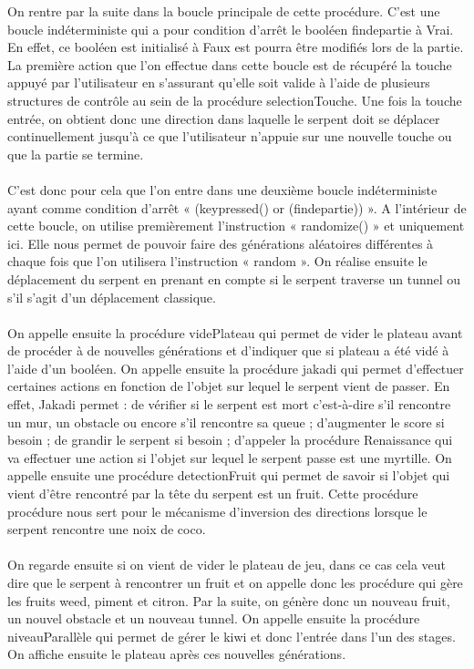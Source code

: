 \documentclass[11pt,a4paper]{article}
\begin{document}
        On rentre par la suite dans la boucle principale de cette procédure. C’est une boucle indéterministe qui a pour condition d’arrêt le booléen findepartie à Vrai. En effet, ce booléen est initialisé à Faux est pourra être modifiés lors de la partie. La première action que l’on effectue dans cette boucle est de récupéré la touche appuyé par l’utilisateur en s’assurant qu’elle soit valide à l’aide de plusieurs structures de contrôle au sein de la procédure selectionTouche. Une fois la touche entrée, on obtient donc une direction dans laquelle le serpent doit se déplacer continuellement jusqu’à ce que l’utilisateur n’appuie sur une nouvelle touche ou que la partie se termine.\\\\
        C’est donc pour cela que l’on entre dans une deuxième boucle indéterministe ayant comme condition d’arrêt « (keypressed() or (findepartie)) ». A l’intérieur de cette boucle, on utilise premièrement l’instruction « randomize() » et uniquement ici. Elle nous permet de pouvoir faire des générations aléatoires différentes à chaque fois que l’on utilisera l’instruction « random ». On réalise ensuite le déplacement du serpent en prenant en compte si le serpent traverse un tunnel ou s’il s’agit d’un déplacement classique. \\\\
        On appelle ensuite la procédure videPlateau qui permet de vider le plateau avant de procéder à de nouvelles générations et d’indiquer que si plateau a été vidé à l’aide d’un booléen. On appelle ensuite la procédure jakadi qui permet d’effectuer certaines actions en fonction de l’objet sur lequel le serpent vient de passer. En effet, Jakadi permet : de vérifier si le serpent est mort c’est-à-dire s'il rencontre un mur, un obstacle ou encore s’il rencontre sa queue ; d’augmenter le score si besoin ; de grandir le serpent si besoin ; d’appeler la procédure Renaissance qui va effectuer une action si l’objet sur lequel le serpent passe est une myrtille. On appelle ensuite une procédure detectionFruit qui permet de savoir si l’objet qui vient d’être rencontré par la tête du serpent est un fruit. Cette procédure procédure nous sert pour le mécanisme d’inversion des directions lorsque le serpent rencontre une noix de coco.\\\\
        On regarde ensuite si on vient de vider le plateau de jeu, dans ce cas cela veut dire que le serpent à rencontrer un fruit et on appelle donc les procédure qui gère les fruits weed, piment et citron. Par la suite, on génère donc un nouveau fruit, un nouvel obstacle et un nouveau tunnel. On appelle ensuite la procédure niveauParallèle qui permet de gérer le kiwi et donc l’entrée dans l’un des stages. On affiche ensuite le plateau après ces nouvelles générations. \\\\
\end{document}
